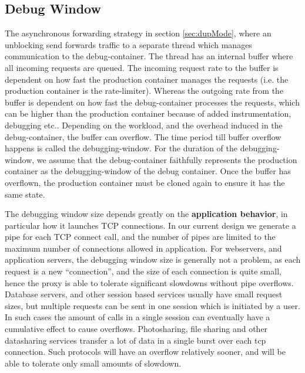
\subsection{Debug Window}
\label{sec:window}

The asynchronous forwarding strategy in section \ref{sec:dupMode}, where an unblocking send forwards traffic to a separate thread which manages communication to the debug-container. 
The thread has an internal buffer where all incoming requests are queued. 
The incoming request rate to the buffer is dependent on how fast the production container manages the requests (i.e. the production container is the rate-limiter).
Whereas the outgoing rate from the buffer is dependent on how fast the debug-container processes the requests, which can be higher than the production container because of added instrumentation, debugging etc..
Depending on the workload, and the overhead induced in the debug-container, the buffer can overflow. 
The time period till buffer overflow happens is called the debugging-window.
For the duration of the debugging-window, we assume that the debug-container faithfully represents the production container as the debugging-window of the debug container. 
Once the buffer has overflown, the production container must be cloned again to ensure it has the same state.

The debugging window size depends greatly on the \textbf{application behavior}, in particular how it launches TCP connections. 
In our current design we generate a pipe for each TCP connect call, and the number of pipes are limited to the maximum number of connections allowed in application.
For webservers, and application servers, the debugging window size is generally not a problem, as each request is a new ``connection'', and the size of each connection is quite small, hence the proxy is able to tolerate significant slowdowns without pipe overflows.
Database servers, and other session based services usually have small request sizes, but multiple requests can be sent in one session which is initiated by a user. In such cases the amount of calls in a single session can eventually have a cumulative effect to cause overflows.
Photosharing, file sharing and other datasharing services transfer a lot of data in a single burst over each tcp connection. Such protocols will have an overflow relatively sooner, and will be able to tolerate only small amounts of slowdown. 

